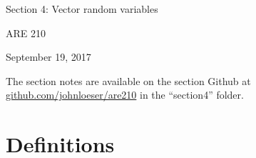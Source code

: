 \documentclass[12pt,english]{article}
\begin{document}
\begin{center}
{\Large{}Section 4: Vector random variables}
\par\end{center}{\Large \par}

\begin{center}
ARE 210
\par\end{center}

\begin{center}
September 19, 2017
\par\end{center}

The section notes are available on the section Github at \href{github.com/johnloeser/are210}{github.com/johnloeser/are210} in the ``section4'' folder.

\section{Definitions}
\end{document}
